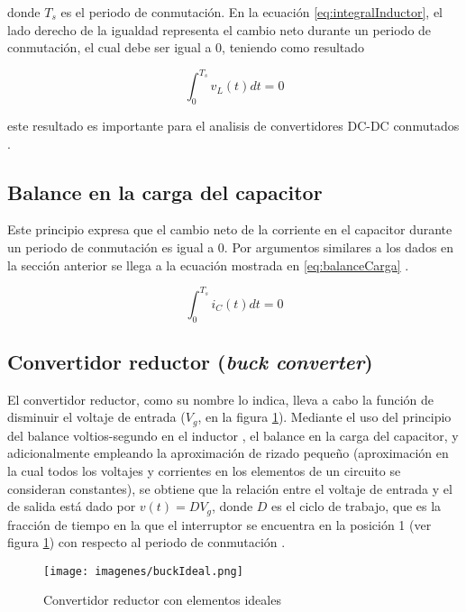 donde $T_s$ es el periodo de conmutación. En la ecuación \ref{eq:integralInductor}, el lado
derecho de la igualdad representa el cambio neto durante un periodo de conmutación, el cual 
debe ser igual a 0, teniendo como resultado

\begin{equation}
    \int_0^{T_s} v_L(t) d t = 0
\end{equation}

este resultado es importante para el analisis de convertidores DC-DC conmutados \cite{erickson_fundamentals_2020}.

\subsection{Balance en la carga del capacitor}

Este principio expresa que el cambio neto de la corriente en el capacitor durante un periodo 
de conmutación es igual a 0. Por argumentos similares a los dados en la sección anterior se 
llega a la ecuación mostrada en \ref{eq:balanceCarga} \cite{erickson_fundamentals_2020}.

\begin{equation}
    \int_0^{T_s} i_C(t) d t = 0
    \label{eq:balanceCarga}
\end{equation}

\subsection{Convertidor reductor (\textit{buck converter})}

El convertidor reductor, como su nombre lo indica, lleva a cabo la función de disminuir el voltaje de entrada ($V_g$, en la figura \ref{fig:buck}). Mediante el uso del principio del
balance voltios-segundo en el inductor , el balance en la carga del capacitor, y adicionalmente empleando la aproximación de rizado pequeño (aproximación en la cual todos los 
voltajes y corrientes en los elementos de un circuito se consideran constantes), se obtiene que la relación entre el voltaje de entrada y el de salida está dado por $v(t)=DV_g$, donde $D$ es el ciclo de trabajo, que es la fracción de tiempo en la que el interruptor se encuentra en la posición 1 (ver figura \ref{fig:buck}) con respecto al periodo de conmutación \cite{erickson_fundamentals_2020}.

\begin{figure}[H]
    \centering
    \texttt{[image: imagenes/buckIdeal.png]}
    \caption{Convertidor reductor con elementos ideales \cite{erickson_fundamentals_2020}}
    \label{fig:buck}
\end{figure}


